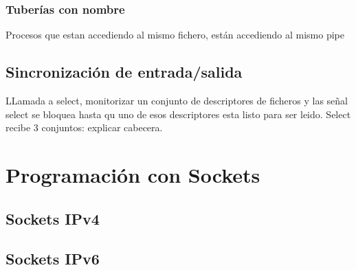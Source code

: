 \subsubsection{Tuberías con nombre}
Procesos que estan accediendo al mismo fichero, están accediendo al mismo pipe
\subsection{Sincronización de entrada/salida}
LLamada a select, monitorizar un conjunto de descriptores de ficheros y las señal select se bloquea hasta qu uno de esos descriptores esta listo para ser leido.
Select recibe 3 conjuntos: explicar cabecera.

\section{Programación con Sockets}
\subsection{Sockets IPv4}
\subsection{Sockets IPv6}